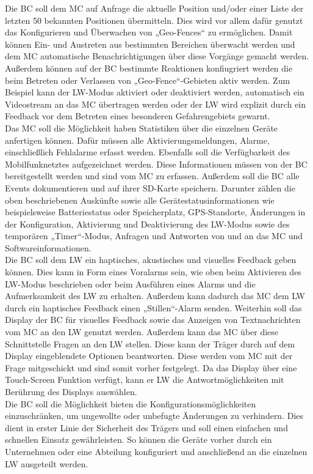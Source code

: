 \documentclass[thesis.tex]{subfiles}
\begin{document}
Die BC soll dem MC auf Anfrage die aktuelle Position und/oder einer Liste der letzten 50 bekannten Positionen übermitteln.
Dies wird vor allem dafür genutzt das Konfigurieren und Überwachen von „Geo-Fences“ zu ermöglichen.
Damit können Ein- und Austreten aus bestimmten Bereichen überwacht werden und dem MC automatische Benachrichtigungen
über diese Vorgänge gemacht werden.
Außerdem können auf der BC bestimmte Reaktionen konfiugriert werden die beim Betreten oder Verlassen von „Geo-Fence“-Gebieten aktiv werden.
Zum Beispiel kann der LW-Modus aktiviert oder deaktiviert werden, automatisch ein Videostream an das MC übertragen werden
oder der LW wird explizit durch ein Feedback vor dem Betreten eines besonderen Gefahrengebiets gewarnt.
\\

Das MC soll die Möglichkeit haben Statistiken über die einzelnen Geräte anfertigen können.
Dafür müssen alle Aktivierungsmeldungen, Alarme, einschließlich Fehlalarme erfasst werden.
Ebenfalls soll die Verfügbarkeit des Mobilfunknetztes aufgezeichnet werden.
Diese Informationen müssen von der BC bereitgestellt werden und sind vom MC zu erfassen.
Außerdem soll die BC alle Events dokumentieren und auf ihrer SD-Karte speichern.
Darunter zählen die oben beschriebenen Auskünfte sowie alle Gerätestatusinformationen wie beispielsweise Batteriestatus
oder Speicherplatz, GPS-Standorte, Änderungen in der Konfiguration, Aktivierung und Deaktivierung des LW-Modus
sowie des temporären „Timer“-Modus, Anfragen und Antworten von und an das MC und Softwareinformationen.
\\

Die BC soll dem LW ein haptisches, akustisches und visuelles Feedback geben können.
Dies kann in Form eines Voralarms sein, wie oben beim Aktivieren des LW-Modus beschrieben oder beim Ausführen eines Alarms
und die Aufmerksamkeit des LW zu erhalten.
Außerdem kann dadurch das MC dem LW durch ein haptisches Feedback einen „Stillen“-Alarm senden.
Weiterhin soll das Display der BC für visuelles Feedback sowie das Anzeigen von Textnachrichten vom MC an den LW genutzt werden.
Außerdem kann das MC über diese Schnittstelle Fragen an den LW stellen.
Diese kann der Träger durch auf dem Display eingeblendete Optionen beantworten.
Diese werden vom MC mit der Frage mitgeschickt und sind somit vorher festgelegt.
Da das Display über eine Touch-Screen Funktion verfügt, kann er LW die Antwortmöglichkeiten mit Berührung des Displays auswählen.
\\

Die BC soll die Möglichkeit bieten die Konfigurationsmöglichkeiten einzuschränken, um ungewollte oder unbefugte Änderungen zu verhindern.
Dies dient in erster Linie der Sicherheit des Trägers und soll einen einfachen und schnellen Einsatz gewährleisten.
So können die Geräte vorher durch ein Unternehmen oder eine Abteilung konfiguriert und anschließend an die einzelnen LW ausgeteilt werden.
\\


\subfilebib %
\end{document}
